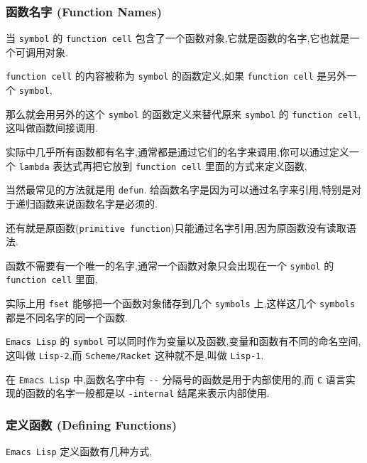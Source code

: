 \documentclass[11pt]{article}
\begin{document}
\subsubsection{函数名字 (Function Names)}
\label{sec:org249d2bd}

当 \texttt{symbol} 的 \texttt{function cell} 包含了一个函数对象,它就是函数的名字,它也就是一个可调用对象.

\texttt{function cell} 的内容被称为 \texttt{symbol} 的函数定义,如果 \texttt{function cell} 是另外一个 \texttt{symbol},

那么就会用另外的这个 \texttt{symbol} 的函数定义来替代原来 \texttt{symbol} 的 \texttt{function cell},这叫做函数间接调用.

实际中几乎所有函数都有名字,通常都是通过它们的名字来调用,你可以通过定义一个 \texttt{lambda} 表达式再把它放到 \texttt{function cell} 里面的方式来定义函数,

当然最常见的方法就是用 \texttt{defun}. 给函数名字是因为可以通过名字来引用,特别是对于递归函数来说函数名字是必须的.

还有就是原函数(\texttt{primitive function})只能通过名字引用,因为原函数没有读取语法.

函数不需要有一个唯一的名字,通常一个函数对象只会出现在一个 \texttt{symbol} 的 \texttt{function cell} 里面,

实际上用 \texttt{fset} 能够把一个函数对象储存到几个 \texttt{symbols} 上,这样这几个 \texttt{symbols} 都是不同名字的同一个函数.

\texttt{Emacs Lisp} 的 \texttt{symbol} 可以同时作为变量以及函数,变量和函数有不同的命名空间,这叫做 \texttt{Lisp-2},而 \texttt{Scheme/Racket} 这种就不是,叫做 \texttt{Lisp-1}.

在 \texttt{Emacs Lisp} 中,函数名字中有 \texttt{-{}-{}} 分隔号的函数是用于内部使用的,而 \texttt{C} 语言实现的函数的名字一般都是以 \texttt{-internal} 结尾来表示内部使用.



\subsubsection{定义函数 (Defining Functions)}
\label{sec:org5307245}

\texttt{Emacs Lisp} 定义函数有几种方式,
\end{document}
